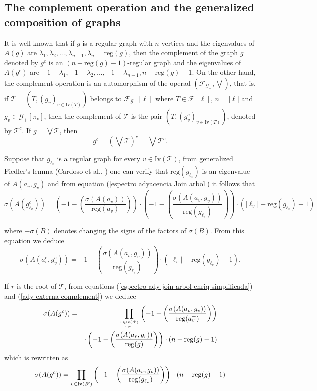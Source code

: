\documentclass[11pt]{article}
\theoremstyle{definition}
\begin{document}
\subsection{The complement operation and the generalized composition of graphs}
 It is well known that if $g$ is a regular graph with $n$ vertices and the eigenvalues of $A(g)$ are $\lambda_1, \lambda_2,...,\lambda_{n-1}, \lambda_n=\mathrm{reg}(g)$, then the complement of the graph $g$ denoted by $g^c$ is an $(n-\mathrm{reg}(g)-1)$-regular graph and the eigenvalues of $A(g^c)$ are $-1-\lambda_1, -1-\lambda_2,...,-1-\lambda_{n-1}, n-\mathrm{reg}(g)-1$. On the other hand, the complement operation is an automorphism of the operad $(\mathscr{F}_{\mathscr{G}_+}, \bigvee)$, that is, if $\mathscr{T}=(T, (g_v)_{v\in \mathrm{Iv}(T)})$ belongs to $\mathscr{F}_{\mathscr{G_+}}[\ell]$ where $T\in\mathscr{F}[\ell]$, $n=|\ell|$ and $g_v\in \mathscr{G}_+[\pi_v]$, then the complement of $\mathscr{T}$ is the pair $(T, (g^c_v)_{v\in \mathrm{Iv}(T)})$, denoted by $\mathscr{T}^c$. If $g=\bigvee \mathscr{T}$, then
\[g^c=\left(\bigvee \mathscr{T}\right)^c=\bigvee \mathscr{T}^c.\]

 Suppose that $g_{\ell_v}$ is a regular graph for every $v\in \mathrm{Iv}(\mathscr{T})$, from generalized Fiedler's lemma (Cardoso et al., \cite{Cardoso2013}) one can verify that $\mathrm{reg}(g_{\ell_v})$ is an eigenvalue of $A(a_v, g_v)$ and from equation (\ref{espectro adyacencia Join arbol}) it follows that
\begin{equation}
\sigma(A(g^c_{\ell_v}))=\left(-1-\left(\dfrac{\sigma(A(a_v))}{\mathrm{reg}(a_v)}\right)\right)\cdot \left(-1-\left(\dfrac{\sigma(A(a_v,g_v))}{\mathrm{reg}(g_{\ell_v})}\right)\right)\cdot(|\ell_v|-\mathrm{reg}(g_{\ell_v})-1)
\end{equation}

where $-\sigma(B)$ denotes changing the signs of the factors of $\sigma(B)$. From this equation we deduce
\begin{equation}\label{ady externa complement}
\sigma(A(a_v^c, g_v^c))=-1-\left(\dfrac{\sigma(A(a_v,g_v))}{\mathrm{reg}(g_{\ell_v})}\right)\cdot(|\ell_v|-\mathrm{reg}(g_{\ell_v})-1).
\end{equation}

If $r$ is the root of $\mathscr{T}$, from equations (\ref{espectro ady join arbol enriq simplificada}) and (\ref{ady externa complement}) we deduce
\begin{eqnarray*}
  \sigma(A(g^c))&=&\prod_{v\in \mathrm{Iv}(\mathscr{T})\atop v\neq r}\left(-1-\left(\dfrac{\sigma(A(a_v,g_v))}{\mathrm{reg}(a^+_v)}\right)\right)\\
  &&\cdot\left(-1 -\left( \dfrac{\sigma(A(a_r,g_r))}{\mathrm{reg}(g)} \right)\right)
\cdot (n-\mathrm{reg}(g)-1)\\
\end{eqnarray*}
 which is rewritten as
\begin{equation}
  \sigma(A(g^c))=\prod_{v\in \mathrm{Iv}(\mathscr{T})}\left(-1-\left(\dfrac{\sigma(A(a_v,g_v))}{\mathrm{reg}(g_{\ell_v})}\right)\right)\\
\cdot (n-\mathrm{reg}(g)-1)
\end{equation}
\end{document}
